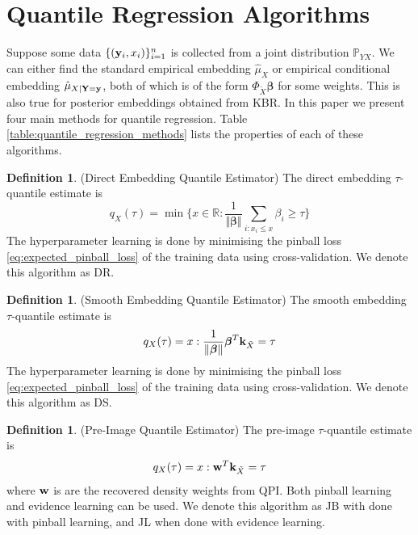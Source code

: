 \documentclass[twoside]{article} \usepackage{aistats2017}
\theoremstyle{definition}
\newtheorem{definition}[theorem]{Definition}
\newcommand{\rv}[1]{{#1}}
\newcommand{\ds}[1]{\tilde{#1}}
\begin{document}
\section{Quantile Regression Algorithms}
\label{sec:quantile_regression_algorithms}
	
	Suppose some data $\{(\mathbf{y}_{i}, x_{i})\}_{i = 1}^{n}$ is collected from a joint distribution $\mathbb{P}_{\rv{Y} \rv{X}}$. We can either find the standard empirical embedding $\hat{\mu}_{\rv{X}}$ or empirical conditional embedding $\hat{\mu}_{\rv{X} | \bvec{\rv{Y}} = \bvec{y}}$, both of which is of the form $\Phi_{\ds{X}} \bm{\beta}$ for some weights. This is also true for posterior embeddings obtained from KBR. In this paper we present four main methods for quantile regression. 	Table \ref{table:quantile_regression_methods} lists the properties of each of these algorithms.

	\theoremstyle{definition}
	\begin{definition}
		(Direct Embedding Quantile Estimator)
		The direct embedding $\tau$-quantile estimate is
		\begin{equation}
			q_{\rv{X}}(\tau) = \min\{x \in \mathbb{R} : \frac{1}{\Vert \bm{\beta} \Vert} \sum_{i : x_{i} \leq x} \beta_{i} \geq \tau\}
		\end{equation}	
		The hyperparameter learning is done by minimising the pinball loss \eqref{eq:expected_pinball_loss} of the training data using cross-validation. We denote this algorithm as DR.
	\end{definition}
	
	\theoremstyle{definition}
	\begin{definition}
		(Smooth Embedding Quantile Estimator)
		The smooth embedding $\tau$-quantile estimate is
		\begin{equation}
			q_{\rv{X}}(\tau) = x : \frac{1}{\Vert \bm{\beta} \Vert} \bm{\beta}^{T} \bvec{k}_{\ds{X}} = \tau
		\end{equation}	
		The hyperparameter learning is done by minimising the pinball loss \eqref{eq:expected_pinball_loss} of the training data using cross-validation. We denote this algorithm as DS.
	\end{definition}
	
	\theoremstyle{definition}
	\begin{definition}
		(Pre-Image Quantile Estimator)
		The pre-image $\tau$-quantile estimate is
		\begin{equation}
			q_{\rv{X}}(\tau) = x : \bvec{w}^{T} \bvec{k}_{\ds{X}} = \tau
		\end{equation}	
		where $\mathbf{w}$ is are the recovered density weights from QPI.
		Both pinball learning and evidence learning can be used. We denote this algorithm as JB with done with pinball learning, and JL when done with evidence learning.
	\end{definition}
	
\end{document}
